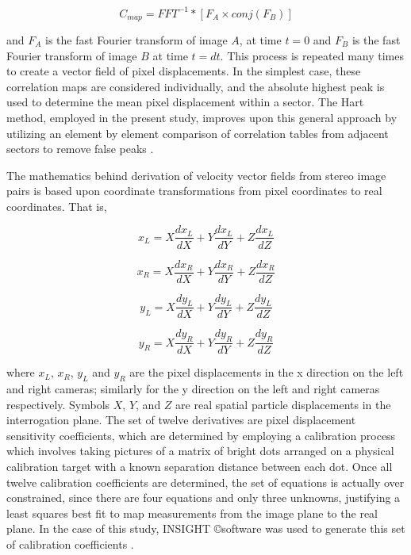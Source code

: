 \begin{equation}
C_{map} = FFT^{-1} * [F_A \times conj(F_B) ]
\label{eq:correlation_map}
\end{equation}

\noindent
and $F_A$ is the fast Fourier transform of 
image $A$, at time $t=0$ and $F_B$ is the fast Fourier transform of image $B$ 
at time $t=dt$. This process is repeated many times to create a vector field of 
pixel displacements. In the simplest case, these correlation maps are 
considered individually, and the absolute highest peak is used to determine the 
mean pixel displacement within a sector. The Hart method, employed in the 
present study, improves upon this general approach by utilizing an element by 
element comparison of correlation tables from adjacent sectors to remove false 
peaks \cite{hart1998,hart1999}.

The mathematics behind derivation of velocity vector fields from stereo image 
pairs is based upon coordinate transformations from pixel coordinates to real 
coordinates. That is, 

\begin{equation}
x_L= X\frac{dx_L}{dX} + Y\frac{dx_L}{dY} + Z\frac{dx_L}{dZ}
\label{eq:piv_to_real1}
\end{equation}

\begin{equation}
x_R= X\frac{dx_R}{dX} + Y\frac{dx_R}{dY} + Z\frac{dx_R}{dZ}
\label{eq:piv_to_real2}
\end{equation}

\begin{equation}
y_L= X\frac{dy_L}{dX} + Y\frac{dy_L}{dY} + Z\frac{dy_L}{dZ}
\label{eq:piv_to_real3}
\end{equation}

\begin{equation}
y_R= X\frac{dy_R}{dX} + Y\frac{dy_R}{dY} + Z\frac{dy_R}{dZ}
\label{eq:piv_to_real4}
\end{equation}


	where $x_L$, $x_R$, $y_L$ and $y_R$ are the pixel displacements in the x 
direction on the left and right cameras; similarly for the y direction on the 
left and 
right cameras respectively. Symbols $X$, $Y$, and $Z$ are real spatial particle 
displacements in the interrogation plane. The set of twelve derivatives are 
pixel displacement sensitivity coefficients, which are determined by employing 
a calibration process which involves taking pictures of a matrix of bright 
dots arranged on a physical calibration target with a known separation distance 
between 
each dot. Once all twelve calibration coefficients are determined, the set of 
equations is actually over constrained, since there are four equations and only 
three unknowns, justifying a least squares best fit to map measurements from 
the image plane to the real plane. In the case of this study, INSIGHT 
\copyright software was used to generate this set of calibration coefficients 
\cite{fouras2007}.

